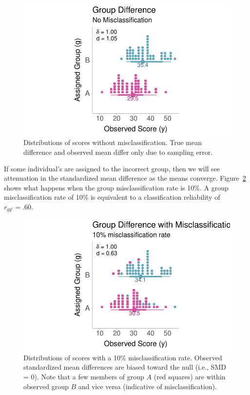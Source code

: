 \documentclass[
  letterpaper,
  DIV=11,
  numbers=noendperiod]{scrreprt}
\begin{document}
\begin{figure}

{\centering \includegraphics{misclassification_files/figure-pdf/fig-nomis-1.pdf}

}

\caption{\label{fig-nomis}Distributions of scores without
misclassification. True mean difference and observed mean differ only
due to sampling error.}

\end{figure}

If some individual's are assigned to the incorrect group, then we will
see attenuation in the standardized mean difference as the means
converge. Figure~\ref{fig-mis} shows what happens when the group
misclassification rate is 10\%. A group misclassification rate of 10\%
is equivalent to a classification reliability of \(r_{gg'}=.60\).

\begin{figure}

{\centering \includegraphics{misclassification_files/figure-pdf/fig-mis-1.pdf}

}

\caption{\label{fig-mis}Distributions of scores with a 10\%
misclassification rate. Observed standardized mean differences are
biased toward the null (i.e., SMD = 0). Note that a few members of group
\(A\) (red squares) are within observed group \(B\) and vice versa
(indicative of misclassification).}

\end{figure}
\end{document}
